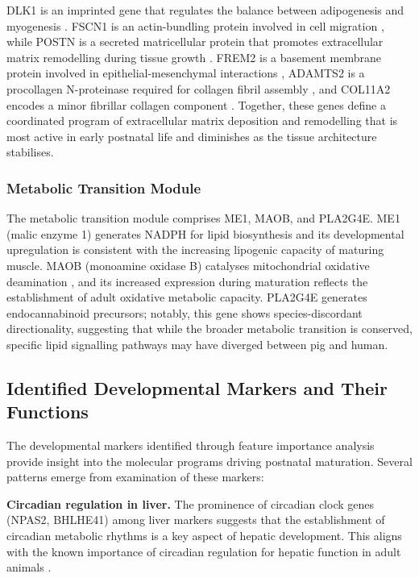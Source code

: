 DLK1 is an imprinted gene that regulates the balance between adipogenesis and myogenesis \parencite{waddell_dlk1_2010, andersen_dual_2013}. FSCN1 is an actin-bundling protein involved in cell migration \parencite{adams_roles_2004}, while POSTN is a secreted matricellular protein that promotes extracellular matrix remodelling during tissue growth \parencite{ozdemir_periostin_2014}. FREM2 is a basement membrane protein involved in epithelial-mesenchymal interactions \parencite{kiyozumi_breakdown_2006}, ADAMTS2 is a procollagen N-proteinase required for collagen fibril assembly \parencite{colige_cdna_1997}, and COL11A2 encodes a minor fibrillar collagen component \parencite{sun_collagen_2020}. Together, these genes define a coordinated program of extracellular matrix deposition and remodelling that is most active in early postnatal life and diminishes as the tissue architecture stabilises.

\subsubsection{Metabolic Transition Module}

The metabolic transition module comprises ME1, MAOB, and PLA2G4E. ME1 (malic enzyme 1) generates NADPH for lipid biosynthesis and its developmental upregulation is consistent with the increasing lipogenic capacity of maturing muscle. MAOB (monoamine oxidase B) catalyses mitochondrial oxidative deamination \parencite{shih_monoamine_1999}, and its increased expression during maturation reflects the establishment of adult oxidative metabolic capacity. PLA2G4E generates endocannabinoid precursors; notably, this gene shows species-discordant directionality, suggesting that while the broader metabolic transition is conserved, specific lipid signalling pathways may have diverged between pig and human.

\subsection{Identified Developmental Markers and Their Functions}

The developmental markers identified through feature importance analysis provide insight into the molecular programs driving postnatal maturation. Several patterns emerge from examination of these markers:

\textbf{Circadian regulation in liver.} The prominence of circadian clock genes (NPAS2, BHLHE41) among liver markers suggests that the establishment of circadian metabolic rhythms is a key aspect of hepatic development. This aligns with the known importance of circadian regulation for hepatic function in adult animals \parencite{zhang_night-restricted_2025}.

